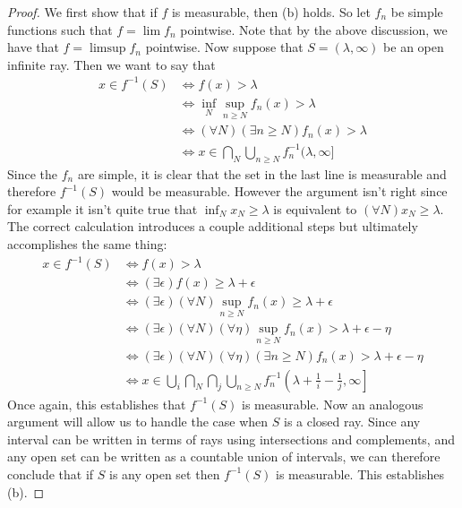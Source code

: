 \documentclass[11pt,oneside]{amsbook}
\theoremstyle{definition}
\theoremstyle{plain}
\theoremstyle{definition}
\theoremstyle{remark}
\numberwithin{equation}{section}
\numberwithin{figure}{section}
\begin{document}
\begin{proof}
  We first show that if $f$ is measurable, then (b) holds. So let $f_n$ be simple functions such that $f=\lim f_n$ pointwise. Note that by the above discussion, we have that $f=\limsup f_n$ pointwise. Now suppose that $S=(\lambda,\infty)$ be an open infinite ray. Then we want to say that
  \begin{align*}
    x\in f^{-1}(S)&\iff f(x)>\lambda\\
          &\iff \inf_N\sup_{n\geq N}f_n(x)>\lambda\\
          &\iff (\forall N)(\exists n\geq N)f_n(x)>\lambda\\
          &\iff x\in\bigcap_N\bigcup_{n\geq N}f_n^{-1}(\lambda,\infty]
  \end{align*}
  Since the $f_n$ are simple, it is clear that the set in the last line is measurable and therefore $f^{-1}(S)$ would be measurable. However the argument isn't right since for example it isn't quite true that $\inf_Nx_N\geq\lambda$ is equivalent to $(\forall N)x_N\geq\lambda$. The correct calculation introduces a couple additional steps but ultimately accomplishes the same thing:
  \begin{align*}
    x\in f^{-1}(S)&\iff f(x)>\lambda\\
          &\iff (\exists\epsilon)f(x)\geq \lambda+\epsilon\\
          &\iff (\exists\epsilon)(\forall N)\sup_{n\geq N} f_n(x)\geq\lambda+\epsilon\\
          &\iff (\exists\epsilon)(\forall N)(\forall\eta)\sup_{n\geq N}f_n(x)>\lambda+\epsilon-\eta\\
          &\iff (\exists\epsilon)(\forall N)(\forall\eta)(\exists n\geq N)f_n(x)>\lambda+\epsilon-\eta\\
          &\iff x\in\bigcup_i\bigcap_N\bigcap_j\bigcup_{n\geq N}f_n^{-1}\left(\lambda+\frac1i-\frac1j,\infty\right]
  \end{align*}
  Once again, this establishes that $f^{-1}(S)$ is measurable. Now an analogous argument will allow us to handle the case when $S$ is a closed ray. Since any interval can be written in terms of rays using intersections and complements, and any open set can be written as a countable union of intervals, we can therefore conclude that if $S$ is any open set then $f^{-1}(S)$ is measurable. This establishes (b).


\end{proof}
\end{document}
